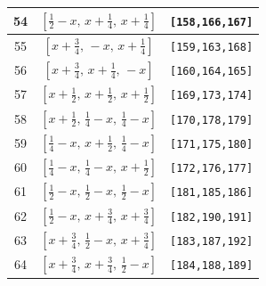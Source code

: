 \documentclass[fleqn,8pt]{jsarticle}
\begin{document}
\begin{longtable}{ccc}
54 & $\left[ \frac{1}{2} - x,\, x + \frac{1}{4},\, x + \frac{1}{4} \right]$ & {\tt [158,166,167]} \\ \hline
55 & $\left[ x + \frac{3}{4},\, - x,\, x + \frac{1}{4} \right]$ & {\tt [159,163,168]} \\ \hline
56 & $\left[ x + \frac{3}{4},\, x + \frac{1}{4},\, - x \right]$ & {\tt [160,164,165]} \\ \hline
57 & $\left[ x + \frac{1}{2},\, x + \frac{1}{2},\, x + \frac{1}{2} \right]$ & {\tt [169,173,174]} \\ \hline
58 & $\left[ x + \frac{1}{2},\, \frac{1}{4} - x,\, \frac{1}{4} - x \right]$ & {\tt [170,178,179]} \\ \hline
59 & $\left[ \frac{1}{4} - x,\, x + \frac{1}{2},\, \frac{1}{4} - x \right]$ & {\tt [171,175,180]} \\ \hline
60 & $\left[ \frac{1}{4} - x,\, \frac{1}{4} - x,\, x + \frac{1}{2} \right]$ & {\tt [172,176,177]} \\ \hline
61 & $\left[ \frac{1}{2} - x,\, \frac{1}{2} - x,\, \frac{1}{2} - x \right]$ & {\tt [181,185,186]} \\ \hline
62 & $\left[ \frac{1}{2} - x,\, x + \frac{3}{4},\, x + \frac{3}{4} \right]$ & {\tt [182,190,191]} \\ \hline
63 & $\left[ x + \frac{3}{4},\, \frac{1}{2} - x,\, x + \frac{3}{4} \right]$ & {\tt [183,187,192]} \\ \hline
64 & $\left[ x + \frac{3}{4},\, x + \frac{3}{4},\, \frac{1}{2} - x \right]$ & {\tt [184,188,189]} \\
\end{longtable}
\renewcommand{\arraystretch}{1.2}
\end{document}
